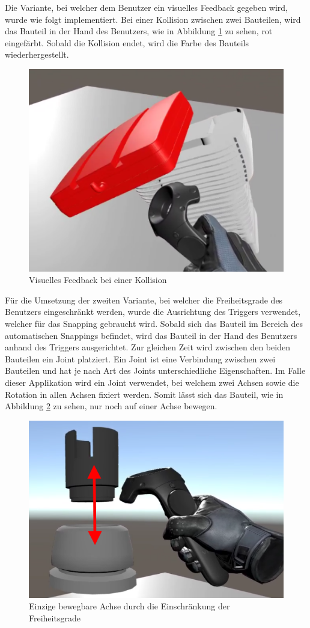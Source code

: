 \noindent Die Variante, bei welcher dem Benutzer ein visuelles Feedback gegeben wird, wurde wie folgt implementiert. Bei einer Kollision zwischen zwei Bauteilen, wird das Bauteil in der Hand des Benutzers, wie in Abbildung \ref{fig:kollision_variante_1} zu sehen, rot eingefärbt. Sobald die Kollision endet, wird die Farbe des Bauteils wiederhergestellt.

\begin{figure}[h!]
	\centering
	\includegraphics[keepaspectratio,width=0.37\linewidth]{img/Kollision_Variante1.PNG}
	\caption{Visuelles Feedback bei einer Kollision}
	\label{fig:kollision_variante_1}
\end{figure}

Für die Umsetzung der zweiten Variante, bei welcher die Freiheitsgrade des Benutzers eingeschränkt werden, wurde die Ausrichtung des Triggers verwendet, welcher für das Snapping gebraucht wird. Sobald sich das Bauteil im Bereich des automatischen Snappings befindet, wird das Bauteil in der Hand des Benutzers anhand des Triggers ausgerichtet. Zur gleichen Zeit wird zwischen den beiden Bauteilen ein Joint platziert. Ein Joint ist eine Verbindung zwischen zwei Bauteilen und hat je nach Art des Joints unterschiedliche Eigenschaften. Im Falle dieser Applikation wird ein Joint verwendet, bei welchem zwei Achsen sowie die Rotation in allen Achsen fixiert werden. Somit lässt sich das Bauteil, wie in Abbildung \ref{fig:einschraenkung_freiheitsgrade} zu sehen, nur noch auf einer Achse bewegen.

\begin{figure}[h!]
	\centering
	\includegraphics[keepaspectratio,width=0.4\linewidth]{img/Einschraenkung_Freiheitsgrade.PNG}
	\caption{Einzige bewegbare Achse durch die Einschränkung der Freiheitsgrade}
	\label{fig:einschraenkung_freiheitsgrade}
\end{figure}


